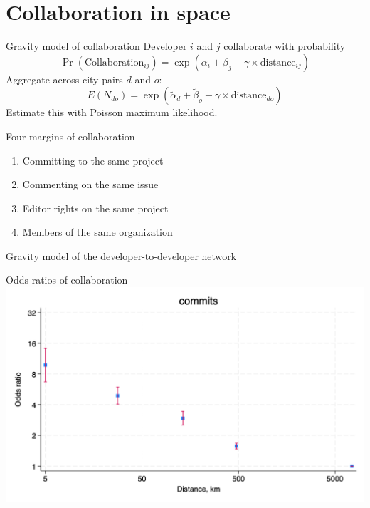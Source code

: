 \documentclass[
  ignorenonframetext,
  aspectratio=1610,
]{beamer}
\providecommand{\tightlist}{%
  \setlength{\itemsep}{0pt}\setlength{\parskip}{0pt}}
\begin{document}
\section{Collaboration in space}\label{collaboration-in-space}

\begin{frame}{Gravity model of collaboration}
\protect\hypertarget{gravity-model-of-collaboration}{}
Developer \(i\) and \(j\) collaborate with probability \[
\Pr(\text{Collaboration}_{ij}) = \exp(\alpha_i + \beta_j -\gamma\times\text{distance}_{ij})
\] Aggregate across city pairs \(d\) and \(o\): \[
E(N_{do}) = \exp(\tilde\alpha_d + \tilde\beta_o -\gamma\times\text{distance}_{do})
\] Estimate this with Poisson maximum likelihood.
\end{frame}

\begin{frame}{Four margins of collaboration}
\protect\hypertarget{four-margins-of-collaboration}{}
\begin{enumerate}
\tightlist
\item
  Committing to the same project
\item
  Commenting on the same issue
\item
  Editor rights on the same project
\item
  Members of the same organization
\end{enumerate}
\end{frame}

\begin{frame}{Gravity model of the developer-to-developer network}
\protect\hypertarget{gravity-model-of-the-developer-to-developer-network}{}

\end{frame}

\begin{frame}{Odds ratios of collaboration}
\protect\hypertarget{odds-ratios-of-collaboration}{}
\includegraphics{figures/commits_gravity.png}
\end{frame}
\end{document}
